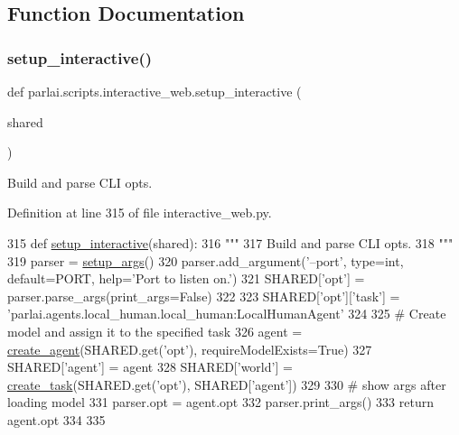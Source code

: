 \subsection{Function Documentation}
\mbox{\label{namespaceparlai_1_1scripts_1_1interactive__web_abeab09cab4f9e60077ffd5050bff36ef}} 
\subsubsection{\texorpdfstring{setup\+\_\+interactive()}{setup\_interactive()}}
{\footnotesize\ttfamily def parlai.\+scripts.\+interactive\+\_\+web.\+setup\+\_\+interactive (\begin{DoxyParamCaption}\item[{}]{shared }\end{DoxyParamCaption})}

\begin{DoxyVerb}Build and parse CLI opts.
\end{DoxyVerb}
 

Definition at line 315 of file interactive\+\_\+web.\+py.


\begin{DoxyCode}
315 \textcolor{keyword}{def }\hyperlink{namespaceparlai_1_1scripts_1_1interactive__web_abeab09cab4f9e60077ffd5050bff36ef}{setup\_interactive}(shared):
316     \textcolor{stringliteral}{"""}
317 \textcolor{stringliteral}{    Build and parse CLI opts.}
318 \textcolor{stringliteral}{    """}
319     parser = \hyperlink{namespaceparlai_1_1chat__service_1_1services_1_1browser__chat_1_1client_a20c9862417d1f1a61b06551de0820ee4}{setup\_args}()
320     parser.add\_argument(\textcolor{stringliteral}{'--port'}, type=int, default=PORT, help=\textcolor{stringliteral}{'Port to listen on.'})
321     SHARED[\textcolor{stringliteral}{'opt'}] = parser.parse\_args(print\_args=\textcolor{keyword}{False})
322 
323     SHARED[\textcolor{stringliteral}{'opt'}][\textcolor{stringliteral}{'task'}] = \textcolor{stringliteral}{'parlai.agents.local\_human.local\_human:LocalHumanAgent'}
324 
325     \textcolor{comment}{# Create model and assign it to the specified task}
326     agent = \hyperlink{namespaceparlai_1_1core_1_1agents_a00d77a7e26fb89e8bd900f7b2a02982a}{create\_agent}(SHARED.get(\textcolor{stringliteral}{'opt'}), requireModelExists=\textcolor{keyword}{True})
327     SHARED[\textcolor{stringliteral}{'agent'}] = agent
328     SHARED[\textcolor{stringliteral}{'world'}] = \hyperlink{namespaceparlai_1_1core_1_1worlds_a79969c7ba76d4b3c500f5bb776444dc6}{create\_task}(SHARED.get(\textcolor{stringliteral}{'opt'}), SHARED[\textcolor{stringliteral}{'agent'}])
329 
330     \textcolor{comment}{# show args after loading model}
331     parser.opt = agent.opt
332     parser.print\_args()
333     \textcolor{keywordflow}{return} agent.opt
334 
335 
\end{DoxyCode}


